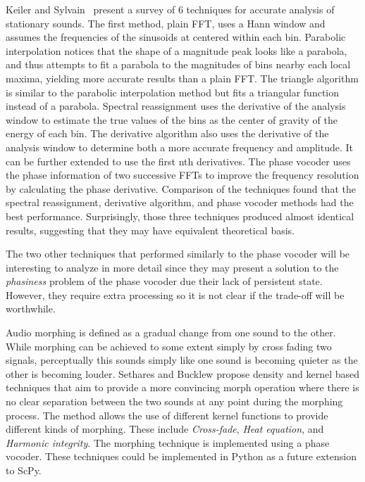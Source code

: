 \documentclass{article}
\begin{document}
Keiler and Sylvain~\cite{keiler2002survey} present a survey of 6 techniques for accurate analysis
of stationary sounds. The first method, plain FFT, uses a Hann window and assumes the frequencies
of the sinusoids at centered within each bin. Parabolic interpolation notices that the shape of a
magnitude peak looks like a parabola, and thus attempts to fit a parabola to the magnitudes of bins
nearby each local maxima, yielding more accurate results than a plain FFT\@. The triangle algorithm
is similar to the parabolic interpolation method but fits a triangular function instead of a
parabola. Spectral reassignment uses the derivative of the analysis window to estimate the true
values of the bins as the center of gravity of the energy of each bin. The derivative algorithm
also uses the derivative of the analysis window to determine both a more accurate frequency and
amplitude. It can be further extended to use the first nth derivatives. The phase vocoder uses the
phase information of two successive FFTs to improve the frequency resolution by calculating the
phase derivative. Comparison of the techniques found that the spectral reassignment, derivative
algorithm, and phase vocoder methods had the best performance. Surprisingly, those three techniques
produced almost identical results, suggesting that they may have equivalent theoretical basis.

The two other techniques that performed similarly to the phase vocoder will be interesting to
analyze in more detail since they may present a solution to the \textit{phasiness} problem of the
phase vocoder due their lack of persistent state. However, they require extra processing so it is
not clear if the trade-off will be worthwhile.

Audio morphing is defined as a gradual change from one sound to the other. While morphing can be
achieved to some extent simply by cross fading two signals, perceptually this sounds simply like
one sound is becoming quieter as the other is becoming louder. Sethares and Bucklew
\cite{sethares2012kernel} propose density and kernel based techniques that aim to provide a more
convincing morph operation where there is no clear separation between the two sounds at any point
during the morphing process. The method allows the use of different kernel functions to provide
different kinds of morphing. These include \textit{Cross-fade}, \textit{Heat equation}, and
\textit{Harmonic integrity}. The morphing technique is implemented using a phase vocoder. These
techniques could be implemented in Python as a future extension to ScPy.
\end{document}
